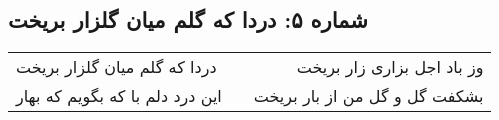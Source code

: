 \begin{center}
\section*{شماره ۵: دردا که گلم میان گلزار بریخت}
\label{sec:005}
\begin{longtable}{l p{0.5cm} r}
دردا که گلم میان گلزار بریخت
&&
وز باد اجل بزاری زار بریخت
\\
این درد دلم با که بگویم که بهار
&&
بشکفت گل و گل من از بار بریخت
\\
\end{longtable}
\end{center}
